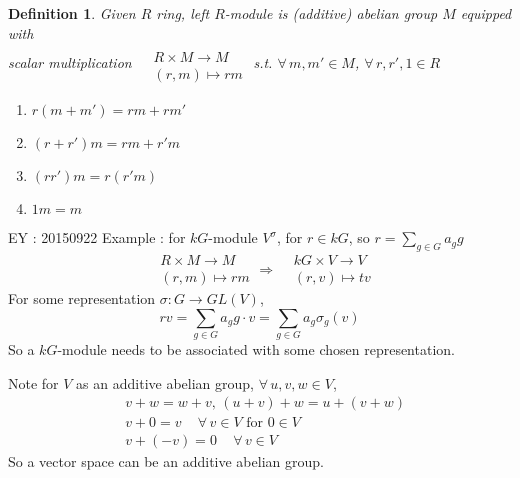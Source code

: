 \documentclass[10pt]{amsart}
\newtheorem{definition}{Definition}
\begin{document}
\begin{multicols*}{2}
\begin{enumerate}
\end{enumerate}

\begin{definition}
	Given $R$ ring, left $R$-module is (additive) abelian group $M$ equipped with \\
	scalar multiplication $\begin{aligned} & \quad \\
	& R \times M \to M \\
	& (r,m) \mapsto rm \end{aligned}$ s.t. $\forall \, m , m' \in M$, $\forall \, r, r' , 1 \in R$
	\begin{enumerate}
		\item[(i)] $r (m+m') = rm + rm' $ 
		\item[(ii)] $(r+r')m = rm + r'm $ 
		\item[(iii)] $(rr')m = r(r'm)$
		\item[(iv)] $1m = m$
	\end{enumerate}
\end{definition}

EY : 20150922 Example : for $kG$-module $V^{\sigma}$, for $r \in kG$, so $r= \sum_{g\in G} a_g g$ 
\[
\begin{aligned} & R \times M \to M \\
& (r,m) \mapsto rm \end{aligned} \Longrightarrow \begin{aligned} & kG \times V \to V \\
& (r,v) \mapsto tv \end{aligned}
\]
For some representation $\sigma : G \to GL(V)$, 
\[
rv = \sum_{g \in G} a_g g \cdot v =\sum_{g\in G} a_g \sigma_g(v)
\]
So a $kG$-module needs to be associated with some chosen representation.  

Note for $V$ as an additive abelian group, $\forall \, u,v,w \in V$, 
\[
\begin{aligned}
& v+w = w+v, \, (u+v) + w = u+(v+w) \\ 
& v+0 = v \quad \, \forall \, v \in V \text{ for } 0 \in V \\ 
& v+ (-v) =0 \quad \, \forall \, v \in V
\end{aligned}
\]
So a vector space can be an additive abelian group.  


\end{multicols*}
\end{document}
